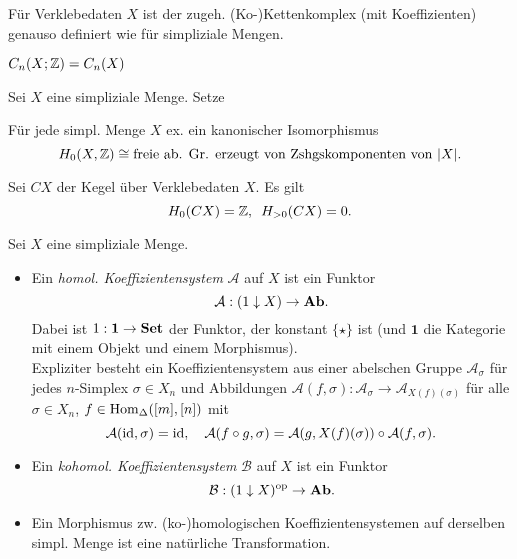 \documentclass{cheat-sheet}
\begin{document}
\begin{defn}
  Für Verklebedaten $X$ ist der zugeh. (Ko-)Kettenkomplex (mit Koeffizienten) genauso definiert wie für simpliziale Mengen.
\end{defn}

\begin{beob}
  $C_n(X; \mathbb{Z}) = C_n(X)$
\end{beob}

\begin{nota}
  Sei $X$ eine simpliziale Menge. Setze
  \begin{itemize}
  \end{itemize}
\end{nota}

\begin{prop}
  Für jede simpl. Menge $X$ ex. ein kanonischer Isomorphismus
  \[ H_0(X, \mathbb{Z}) \cong \text{freie ab. Gr. erzeugt von Zshgskomponenten von $\lvert X\rvert$}. \]
\end{prop}

\begin{prop}
  Sei $CX$ der Kegel über Verklebedaten $X$. Es gilt
  \[ H_0(CX) = \mathbb{Z}, \enspace H_{>0}(CX) = 0. \]
\end{prop}



\begin{defn}
  Sei $X$ eine simpliziale Menge.
  \begin{itemize}
    \item Ein \emph{homol. Koeffizientensystem} $\mathcal{A}$ auf $X$ ist ein Funktor
    \[ \mathcal{A} : (1 \downarrow X) \to \mathbf{Ab}. \]
    Dabei ist $1 : \mathbf{1} \to \mathbf{Set}$ der Funktor, der konstant $\{ \star \}$ ist (und $\mathbf{1}$ die Kategorie mit einem Objekt und einem Morphismus).\\
    Expliziter besteht ein Koeffizientensystem aus einer abelschen Gruppe $\mathcal{A}_\sigma$ für jedes $n$-Simplex $\sigma \in X_n$ und Abbildungen $\mathcal{A}(f, \sigma) : \mathcal{A}_\sigma \to \mathcal{A}_{X(f)(\sigma)}$ für alle $\sigma \in X_n$, $f \in \operatorname{Hom}_{\Delta}([m], [n])$ mit
    \[
      \mathcal{A}(\operatorname{id}, \sigma) = \operatorname{id}, \quad
      \mathcal{A}(f \circ g, \sigma) = \mathcal{A}(g, X(f)(\sigma)) \circ \mathcal{A}(f, \sigma).
    \]
    \item Ein \emph{kohomol. Koeffizientensystem} $\mathcal{B}$ auf $X$ ist ein Funktor
    \[ \mathcal{B} : (1 \downarrow X)^{\mathrm{op}} \to \mathbf{Ab}. \]
    \item Ein Morphismus zw. (ko-)homologischen Koeffizientensystemen auf derselben simpl. Menge ist eine natürliche Transformation.
  \end{itemize}
\end{defn}
\end{document}
